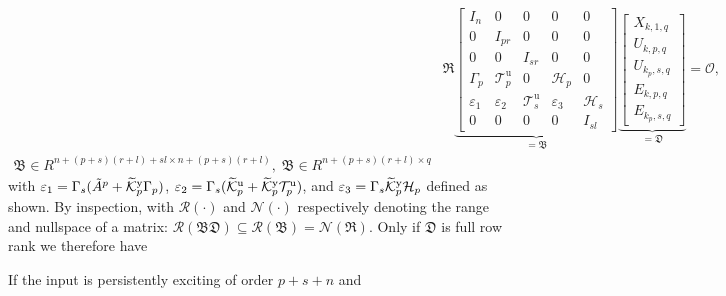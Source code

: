 \begin{align}
    &\mathfrak{R}
    \underbrace{\begin{bmatrix}
        I_n      & 0      & 0       & 0 & 0\\
        0        & I_{pr} & 0       & 0 & 0\\
        0        & 0      & I_{sr}  & 0 & 0\\
        \Gamma_p & \mathcal{T}_p^\mathrm{u} & 0 & \mathcal{H}_p & 0\\
        \varepsilon_1 & \varepsilon_2 & \mathcal{T}_s^\mathrm{u} & \varepsilon_3 & \mathcal{H}_s\\
        0 & 0 & 0 & 0 & I_{sl}
    \end{bmatrix}}_{=\mathfrak{B}}
    \underbrace{\begin{bmatrix}
        X_{k,1,q}\\
        U_{k,p,q}\\
        U_{k_p,s,q}\\
        E_{k,p,q}\\
        E_{k_p,s,q}
    \end{bmatrix}}_{=\mathfrak{D}}=\mathcal{O},\\
    \mathfrak{B}\in{R}^{n+(p+s)(r+l)+sl\times n+(p+s)(r+l)},\;\mathfrak{B}\in{R}^{n+(p+s)(r+l)\times q}
\end{align}
with $\varepsilon_1=\Gamma_s(\tilde{A}^p+\widetilde{\mathcal{K}}_{p}^{\mathrm{{y}}}\Gamma_p)$, $\varepsilon_2=\Gamma_s(\widetilde{\mathcal{K}}_{p}^{\mathrm{{u}}}+\widetilde{\mathcal{K}}_{p}^{\mathrm{{y}}}\mathcal{T}_p^\mathrm{u})$, and $\varepsilon_3=\Gamma_s\widetilde{\mathcal{K}}_{p}^{\mathrm{{y}}}\mathcal{H}_p$ defined as shown. By inspection, with $\mathcal{R}(\cdot)$ and $\mathcal{N}(\cdot)$ respectively denoting the range and nullspace of a matrix: $\mathcal{R}(\mathfrak{B}\mathfrak{D})\subseteq\mathcal{R}(\mathfrak{B})=\mathcal{N}(\mathfrak{R})$. Only if $\mathfrak{D}$ is full row rank we therefore have

\begin{lem}
    If the input is persistently exciting of order $p+s+n$ and
\end{lem}

